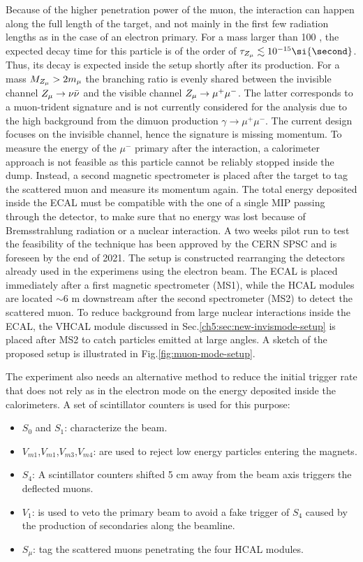 Because of the higher penetration power of the muon, the interaction can happen along the full length of the target, and not mainly in the first few radiation lengths as in the case of an electron primary.
For a mass larger than 100 \mev, the expected decay time for this particle is of the order of $\tau_{\DMU} \lesssim 10^{-15} \si{\second}$. Thus, its decay is expected inside the setup shortly after its production. For a mass $M_{Z_{\mu}} > 2 m_{\mu}$ the branching ratio is evenly shared between the invisible channel $Z_{\mu} \to \nu \bar{\nu}$ and the visible channel $Z_{\mu} \to \mu^+ \mu^-$. The latter corresponds to a muon-trident signature and is not currently considered for the analysis due to the high background from the dimuon production $\gamma \to \mu^+ \mu^-$. The current design focuses on the invisible channel, hence the signature is missing momentum. To measure the energy of the $\mu^-$ primary after the interaction, a calorimeter approach is not feasible as this particle cannot be reliably stopped inside the dump. Instead, a second magnetic spectrometer is placed after the target to tag the scattered muon and measure its momentum again. The total energy deposited inside the ECAL must be compatible with the one of a single MIP passing through the detector, to make sure that no energy was lost because of Bremsstrahlung radiation or a nuclear interaction. A two weeks pilot run to test the feasibility of the technique has been approved by the CERN SPSC and is foreseen by the end of 2021. The setup is constructed rearranging the detectors already used in the experimens using the electron beam. The ECAL is placed immediately after a first magnetic spectrometer (MS1), while the HCAL modules are located $\sim$6 \si{\meter} downstream after the second spectrometer (MS2) to detect the scattered muon. To reduce background from large nuclear interactions inside the ECAL, the VHCAL module discussed in Sec.\ref{ch5:sec:new-invismode-setup} is placed after MS2 to catch particles emitted at large angles. A sketch of the proposed setup is illustrated in Fig.\ref{fig:muon-mode-setup}.

The experiment also needs an alternative method to reduce the initial trigger rate that does not rely as in the electron mode on the energy deposited inside the calorimeters. A set of scintillator counters is used for this purpose:
\begin{itemize}
\item $S_0$ and $S_1$: characterize the beam.
\item $V_{m1}$,$V_{m1}$,$V_{m3}$,$V_{m4}$:  are used to reject low energy particles entering the magnets.
\item $S_4$: A scintillator counters shifted 5 \si{\centi\meter} away from the beam axis triggers the deflected muons.
\item $V_1$: is used to veto the primary beam to avoid a fake trigger of $S_4$ caused by the production of secondaries along the beamline.
\item $S_{\mu}$: tag the scattered muons penetrating the four HCAL modules.
\end{itemize}


